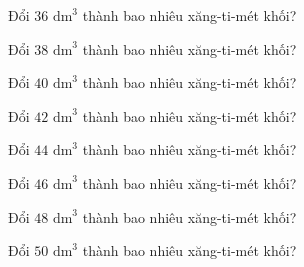 \begin{ex}
  Đổi $36\text{ dm}^3$ thành bao nhiêu xăng-ti-mét khối?
\end{ex}

\begin{ex}
  Đổi $38\text{ dm}^3$ thành bao nhiêu xăng-ti-mét khối?
\end{ex}

\begin{ex}
  Đổi $40\text{ dm}^3$ thành bao nhiêu xăng-ti-mét khối?
\end{ex}

\begin{ex}
  Đổi $42\text{ dm}^3$ thành bao nhiêu xăng-ti-mét khối?
\end{ex}

\begin{ex}
  Đổi $44\text{ dm}^3$ thành bao nhiêu xăng-ti-mét khối?
\end{ex}

\begin{ex}
  Đổi $46\text{ dm}^3$ thành bao nhiêu xăng-ti-mét khối?
\end{ex}

\begin{ex}
  Đổi $48\text{ dm}^3$ thành bao nhiêu xăng-ti-mét khối?
\end{ex}

\begin{ex}
  Đổi $50\text{ dm}^3$ thành bao nhiêu xăng-ti-mét khối?
\end{ex}

